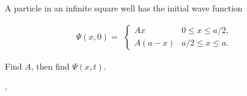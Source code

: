 \begin{example}
    A particle in an infinite square well has the initial wave function 

    \begin{equation}
        \Psi(x,0) =
            \begin{alignedat}{1}
            \begin{cases}
                Ax \qquad & 0 \leq x \leq a/2, \\
                A(a-x) & a/2 \leq x \leq a.
            \end{cases}
            \end{alignedat}
    \end{equation}

    Find $A$, then find $\Psi(x,t)$.

    \sep


\end{example}

